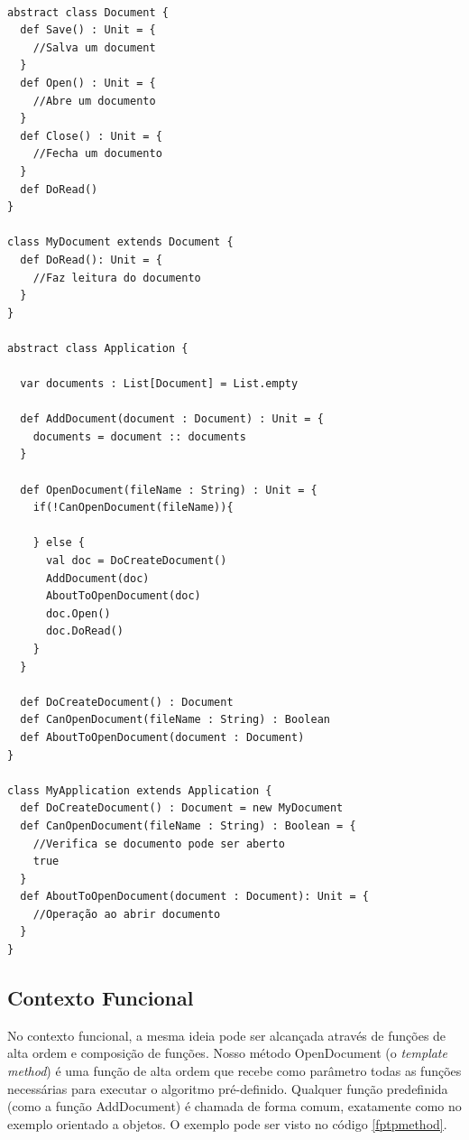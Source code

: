 \begin{lstlisting}[caption={Template Method Orientação a Objetos},label=ootpmethod]

abstract class Document {
  def Save() : Unit = {
    //Salva um document
  }
  def Open() : Unit = {
    //Abre um documento
  }
  def Close() : Unit = {
    //Fecha um documento
  }
  def DoRead()
}

class MyDocument extends Document {
  def DoRead(): Unit = {
    //Faz leitura do documento
  }
}

abstract class Application {

  var documents : List[Document] = List.empty

  def AddDocument(document : Document) : Unit = {
    documents = document :: documents
  }

  def OpenDocument(fileName : String) : Unit = {
    if(!CanOpenDocument(fileName)){

    } else {
      val doc = DoCreateDocument()
      AddDocument(doc)
      AboutToOpenDocument(doc)
      doc.Open()
      doc.DoRead()
    }
  }

  def DoCreateDocument() : Document
  def CanOpenDocument(fileName : String) : Boolean
  def AboutToOpenDocument(document : Document)
}

class MyApplication extends Application {
  def DoCreateDocument() : Document = new MyDocument
  def CanOpenDocument(fileName : String) : Boolean = {
    //Verifica se documento pode ser aberto
    true
  }
  def AboutToOpenDocument(document : Document): Unit = {
    //Operação ao abrir documento
  }
}

\end{lstlisting}

\subsection*{Contexto Funcional}

No contexto funcional, a mesma ideia pode ser alcançada 
através de funções de alta ordem e composição de funções. 
Nosso método OpenDocument (o \textit{template method}) é 
uma função de alta ordem que recebe como parâmetro todas 
as funções necessárias para executar o algoritmo pré-definido. 
Qualquer função predefinida (como a função AddDocument) é 
chamada de forma comum, exatamente como no exemplo 
orientado a objetos. O exemplo pode ser visto no 
código \ref{fptpmethod}.

